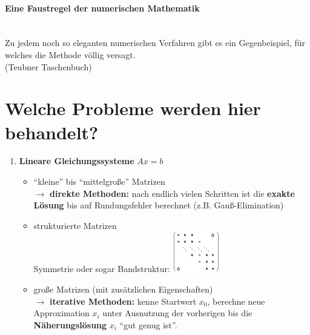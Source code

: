 \documentclass[ngerman,fontsize=11pt, paper=a4, parskip=half, titlepage=true, toc=bib]{scrbook}
\theoremstyle{definition}
\theoremstyle{plain}
\begin{document}
\paragraph{Eine Faustregel der numerischen Mathematik}~\\
Zu jedem noch so eleganten numerischen Verfahren gibt es ein Gegenbeispiel,
für welches die Methode völlig versagt. \\
{\tiny(Teubner Taschenbuch)}

\section*{Welche Probleme werden hier behandelt?}
\begin{enumerate}
\item \textbf{Lineare Gleichungssysteme} $Ax=b$ 
  \begin{itemize}
  \item \enquote{kleine} bis \enquote{mittelgroße} Matrizen\\
    $\rightarrow$ \textbf{direkte Methoden:} nach endlich vielen
    Schritten ist die \textbf{exakte Lösung} bis auf
    Rundungsfehler berechnet (z.B. Gauß-Elimination)
  \item strukturierte Matrizen \\
    Symmetrie oder sogar Bandstruktur: \hspace*{1cm}  
    \includegraphics[width=2cm]{images/band.jpg}
    
  \item große Matrizen (mit zusätzlichen Eigenschaften)\\
    $\rightarrow$ \textbf{iterative Methoden:} kenne Startwert
    $x_0$, berechne neue Approximation $x_i$ unter
    Ausnutzung der vorherigen bis die
    \textbf{Näherungslösung} $x_i$ \enquote{gut genug ist}.
  \end{itemize}
  

\end{enumerate}
\end{document}
